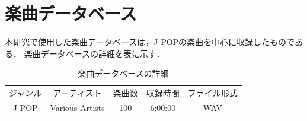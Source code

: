 
\section{楽曲データベース}
\label{app:database}
本研究で使用した楽曲データベースは，J-POPの楽曲を中心に収録したものである．
楽曲データベースの詳細を表に示す．


\begin{table}[tb]
	\caption{楽曲データベースの詳細}
	\label{tab:database}
	\centering
	\begin{tabular}{c|c|c|c|c|c|c|c|c|c} \hline
		\multicolumn{2}{|c|}{\multirow{2}{*}{ジャンル}} & \multicolumn{2}{c|}{\multirow{2}{*}{アーティスト}} & \multicolumn{2}{c|}{\multirow{2}{*}{楽曲数}} & \multicolumn{2}{c|}{\multirow{2}{*}{収録時間}} & \multicolumn{2}{c|}{\multirow{2}{*}{ファイル形式}} \\
		\multicolumn{2}{|c|}{}                      & \multicolumn{2}{c|}{}                        & \multicolumn{2}{c|}{}                     & \multicolumn{2}{c|}{}                      & \multicolumn{2}{c|}{}                        \\ \hline
		\multicolumn{2}{|c|}{J-POP}                 & \multicolumn{2}{c|}{Various Artists}         & \multicolumn{2}{c|}{100}                  & \multicolumn{2}{c|}{6:00:00}               & \multicolumn{2}{c|}{WAV}                     \\ \hline
	\end{tabular}
\end{table}